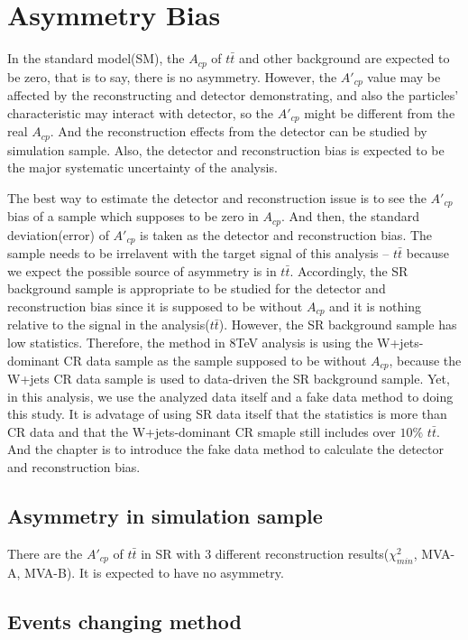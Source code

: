 

\section{Asymmetry Bias}
\label{sec:AsymBias}

	In the standard model(SM), the $A_{cp}$ of $t\bar{t}$ and other background are expected to be zero, that is to say, there is no asymmetry. However, the $A'_{cp}$ value may be affected by the reconstructing and detector demonstrating, and also the particles' characteristic may interact with detector, so the $A'_{cp}$ might be different from the real $A_{cp}$. And the reconstruction effects from the detector can be studied by simulation sample. Also, the detector and reconstruction bias is expected to be the major systematic uncertainty of the analysis.

	The best way to estimate the detector and reconstruction issue is to see the $A'_{cp}$ bias of a sample which supposes to be zero in $A_{cp}$. And then, the standard deviation(error) of $A'_{cp}$ is taken as the detector and reconstruction bias. The sample needs to be irrelavent with the target signal of this analysis -- $t\bar{t}$ because we expect the possible source of asymmetry is in $t\bar{t}$. Accordingly, the SR background sample is appropriate to be studied for the detector and reconstruction bias since it is supposed to be without $A_{cp}$ and it is nothing relative to the signal in the analysis($t\bar{t}$). However, the SR background sample has low statistics. Therefore, the method in 8TeV analysis is using the W+jets-dominant CR data sample as the sample supposed to be without $A_{cp}$, because the W+jets CR data sample is used to data-driven the SR background sample. Yet, in this analysis, we use the analyzed data itself and a fake data method to doing this study. It is advatage of using SR data itself that the statistics is more than CR data and that the W+jets-dominant CR smaple still includes over $10\%$ $t\bar{t}$. And the chapter is to introduce the fake data method to calculate the detector and reconstruction bias.

	\subsection{Asymmetry in simulation sample}
	\label{ssec:Asym_in_sim}

	There are the $A'_{cp}$ of $t\bar{t}$ in SR with 3 different reconstruction results($\chi^2_{min}$, MVA-A, MVA-B). It is expected to have no asymmetry.



	\subsection{Events changing method}
	\label{ssec:evts_changing}

\FloatBarrier
